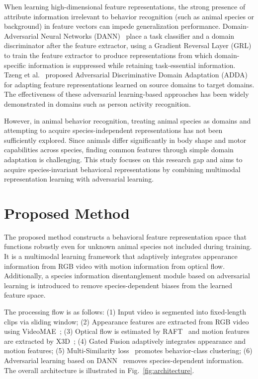 \documentclass[twocolumn]{svjour3}
\begin{document}
When learning high-dimensional feature representations, the strong presence of attribute information irrelevant to behavior recognition (such as animal species or background) in feature vectors can impede generalization performance.
Domain-Adversarial Neural Networks (DANN)~\cite{ganin2016domain} place a task classifier and a domain discriminator after the feature extractor, using a Gradient Reversal Layer (GRL) to train the feature extractor to produce representations from which domain-specific information is suppressed while retaining task-essential information.
Tzeng et al.~\cite{tzeng2017adversarial} proposed Adversarial Discriminative Domain Adaptation (ADDA) for adapting feature representations learned on source domains to target domains.
The effectiveness of these adversarial learning-based approaches has been widely demonstrated in domains such as person activity recognition.

However, in animal behavior recognition, treating animal species as domains and attempting to acquire species-independent representations has not been sufficiently explored.
Since animals differ significantly in body shape and motor capabilities across species, finding common features through simple domain adaptation is challenging.
This study focuses on this research gap and aims to acquire species-invariant behavioral representations by combining multimodal representation learning with adversarial learning.

\section{Proposed Method}
\label{sec:method}

The proposed method constructs a behavioral feature representation space that functions robustly even for unknown animal species not included during training.
It is a multimodal learning framework that adaptively integrates appearance information from RGB video with motion information from optical flow.
Additionally, a species information disentanglement module based on adversarial learning is introduced to remove species-dependent biases from the learned feature space.

The processing flow is as follows:
(1) Input video is segmented into fixed-length clips via sliding window;
(2) Appearance features are extracted from RGB video using VideoMAE~\cite{tong2022videomae};
(3) Optical flow is estimated by RAFT~\cite{teed2020raft} and motion features are extracted by X3D~\cite{feichtenhofer2020x3d};
(4) Gated Fusion adaptively integrates appearance and motion features;
(5) Multi-Similarity loss~\cite{wang2019multi} promotes behavior-class clustering;
(6) Adversarial learning based on DANN~\cite{ganin2016domain} removes species-dependent information.
The overall architecture is illustrated in Fig.~\ref{fig:architecture}.
\end{document}
